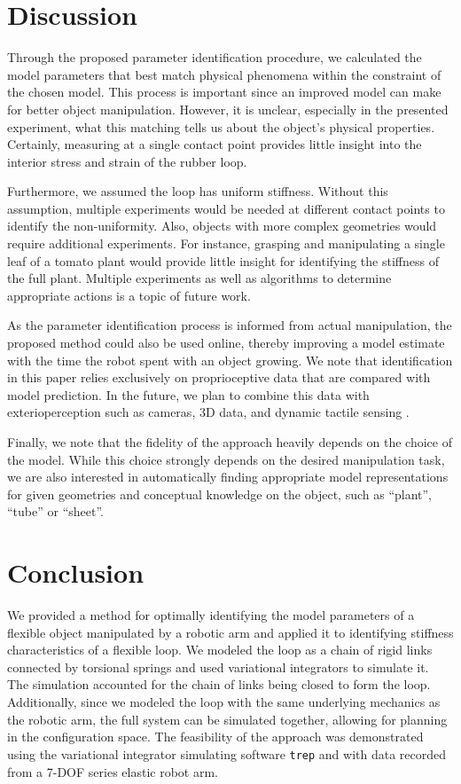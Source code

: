 \documentclass[letterpaper, 10pt, conference]{ieeeconf}
\begin{document}
\section{Discussion}
Through the proposed parameter identification procedure, we calculated the model parameters that best match physical phenomena within the constraint of the chosen model.  This process is important since an improved model can make for better object manipulation.  However, it is unclear, especially in the presented experiment, what this matching tells us about the object's physical properties.  Certainly, measuring at a single contact point provides little insight into the interior stress and strain of the rubber loop.

Furthermore, we assumed the loop has uniform stiffness.  Without this assumption, multiple experiments would be needed at different contact points to identify the non-uniformity.  Also, objects with more complex geometries would require additional experiments.  For instance, grasping and manipulating a single leaf of a tomato plant would provide little insight for identifying the stiffness of the full plant.  Multiple experiments as well as algorithms to determine appropriate actions is a topic of future work.

As the parameter identification process is informed from actual manipulation, the proposed method could also be used online, thereby improving a model estimate with the time the robot spent with an object growing. We note that identification in this paper relies exclusively on proprioceptive data that are compared with model prediction. In the future, we plan to combine this data with exterioperception such as cameras, 3D data, and dynamic tactile sensing \cite{hughes2014}. 

Finally, we note that the fidelity of the approach heavily depends on the choice of the model. While this choice strongly depends on the desired manipulation task, we are also interested in automatically finding appropriate model representations for given geometries and conceptual knowledge on the object, such as ``plant'', ``tube'' or ``sheet''.  

\section{Conclusion}
We provided a method for optimally identifying the model parameters of a flexible object manipulated by a robotic arm and applied it to identifying stiffness characteristics of a flexible loop.  We modeled the loop as a chain of rigid links connected by torsional springs and used variational integrators to simulate it.  The simulation accounted for the chain of links being closed to form the loop. Additionally, since we modeled the loop with the same underlying mechanics as the robotic arm, the full system can be simulated together, allowing for planning in the configuration space.  The feasibility of the approach was demonstrated using the variational integrator simulating software \texttt{trep} and with data recorded from a 7-DOF series elastic robot arm.



\end{document}
